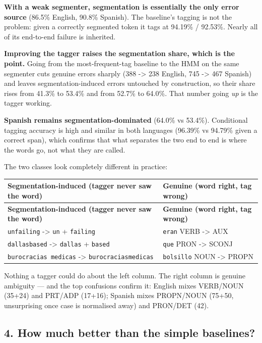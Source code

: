 \documentclass[11pt,a4paper]{article}
\begin{document}
\textbf{With a weak segmenter, segmentation is essentially the only error source} (86.5\% English, 90.8\% Spanish). The baseline's tagging is not the problem: given a correctly segmented token it tags at 94.19\% / 92.53\%. Nearly all of its end-to-end failure is inherited.

\textbf{Improving the tagger raises the segmentation share, which is the point.} Going from the most-frequent-tag baseline to the HMM on the same segmenter cuts genuine errors sharply (388 -> 238 English, 745 -> 467 Spanish) and leaves segmentation-induced errors untouched by construction, so their share rises from 41.3\% to 53.4\% and from 52.7\% to 64.0\%. That number going \textit{up} is the tagger working.

\textbf{Spanish remains segmentation-dominated} (64.0\% vs 53.4\%). Conditional tagging accuracy is high and similar in both languages (96.39\% vs 94.79\% given a correct span), which confirms that what separates the two end to end is where the words go, not what they are called.

The two classes look completely different in practice:

{\small
\setlength{\tabcolsep}{4pt}
\begin{xltabular}{\linewidth}{>{\raggedright\arraybackslash}X>{\raggedright\arraybackslash}X}
\toprule
\textbf{Segmentation-induced (tagger never saw the word)} & \textbf{Genuine (word right, tag wrong)} \\
\midrule
\endfirsthead
\toprule
\textbf{Segmentation-induced (tagger never saw the word)} & \textbf{Genuine (word right, tag wrong)} \\
\midrule
\endhead
\texttt{unfailing} -> \texttt{un} + \texttt{failing} & \texttt{eran} VERB -> AUX \\
\texttt{dallasbased} -> \texttt{dallas} + \texttt{based} & \texttt{que} PRON -> SCONJ \\
\texttt{burocracias medicas} -> \texttt{burocraciasmedicas} & \texttt{bolsillo} NOUN -> PROPN \\
\bottomrule
\end{xltabular}}

Nothing a tagger could do about the left column. The right column is genuine ambiguity --- and the top confusions confirm it: English mixes VERB/NOUN (35+24) and PRT/ADP (17+16); Spanish mixes PROPN/NOUN (75+50, unsurprising once case is normalised away) and PRON/DET (42).

\subsection*{4. How much better than the simple baselines?}
\end{document}
